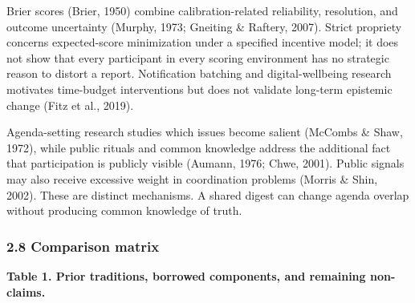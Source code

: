 \documentclass[
  11pt]{article}
\begin{document}
Brier scores (Brier, 1950) combine calibration-related reliability,
resolution, and outcome uncertainty (Murphy, 1973; Gneiting \& Raftery,
2007). Strict propriety concerns expected-score minimization under a
specified incentive model; it does not show that every participant in
every scoring environment has no strategic reason to distort a report.
Notification batching and digital-wellbeing research motivates
time-budget interventions but does not validate long-term epistemic
change (Fitz et al., 2019).

Agenda-setting research studies which issues become salient (McCombs \&
Shaw, 1972), while public rituals and common knowledge address the
additional fact that participation is publicly visible (Aumann, 1976;
Chwe, 2001). Public signals may also receive excessive weight in
coordination problems (Morris \& Shin, 2002). These are distinct
mechanisms. A shared digest can change agenda overlap without producing
common knowledge of truth.

\subsubsection{2.8 Comparison matrix}\label{comparison-matrix}

\textbf{Table 1. Prior traditions, borrowed components, and remaining
non-claims.}
\end{document}

